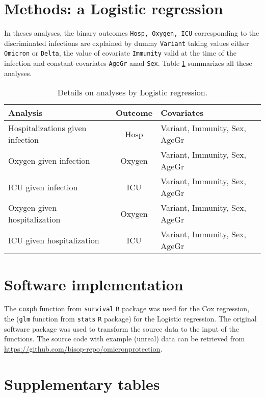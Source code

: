 \documentclass[9pt,onecolumn,twoside,lineno]{pnas-new}
\begin{document}
\section*{Methods: a Logistic regression}

In theses analyses, the binary outcomes {\tt Hosp, Oxygen, ICU} corresponding to the discriminated infections are explained by dummy {\tt Variant} taking values either {\tt Omicron} or {\tt Delta}, the value of covariate {\tt Immunity} valid at the time of the infection and constant covariates {\tt AgeGr} anad {\tt Sex}. Table \ref{tab:lrs} summarizes all these analyses.

\begin{table}
\caption{Details on analyses by Logistic regression. \vspace{1mm}}
\centering
\begin{tabular}{lcl}
\hline
Analysis & Outcome & Covariates \\ 
\hline
Hospitalizations given infection & Hosp & 
Variant, Immunity, Sex, AgeGr \\
Oxygen given infection & Oxygen & 
Variant, Immunity, Sex, AgeGr \\
ICU given infection & ICU & 
Variant, Immunity, Sex, AgeGr \\
Oxygen given hospitalization & Oxygen & 
Variant, Immunity, Sex, AgeGr \\
ICU given hospitalization& ICU & 
Variant, Immunity, Sex, AgeGr \\
\hline
\end{tabular}
\label{tab:lrs}
\end{table}

\section*{Software implementation}

The {\tt coxph} function from {\tt survival} {\tt R} package was used for the Cox regression, the ({\tt glm} function from {\tt stats} {\tt R} package) for the Logistic regression. The original software package was used to transform the source data to the input of the functions. The source code with example (unreal) data can be retrieved from \url{https://github.com/bisop-repo/omicronprotection}.



\section*{Supplementary tables}
\end{document}
